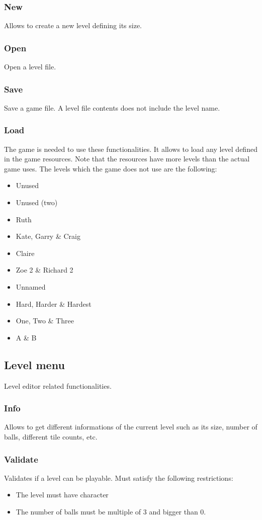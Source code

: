 \documentclass{report}
\theoremstyle{plain}
\begin{document}
\subsubsection{New}
Allows to create a new level defining its size.

\subsubsection{Open}
Open a level file.

\subsubsection{Save}
Save a game file. A level file contents does not include the level name.

\subsubsection{Load}
The game is needed to use these functionalities. It allows to load any level defined in the game resources. Note that the resources have more levels than the actual game uses. The levels which the game does not use are the following:
\begin{itemize}
    \item Unused
    \item Unused (two)
    \item Ruth
    \item Kate, Garry \& Craig
    \item Claire
    \item Zoe 2 \& Richard 2
    \item Unnamed
    \item Hard, Harder \& Hardest
    \item One, Two \& Three
    \item A \& B
\end{itemize}

\subsection{Level menu}
Level editor related functionalities.
\subsubsection{Info}
Allows to get different informations of the current level such as its size, number of balls, different tile counts, etc.

\subsubsection{Validate}
Validates if a level can be playable. Must satisfy the following restrictions:
\begin{itemize}
    \item The level must have character
    \item The number of balls must be multiple of 3 and bigger than 0.
\end{itemize}
\end{document}

